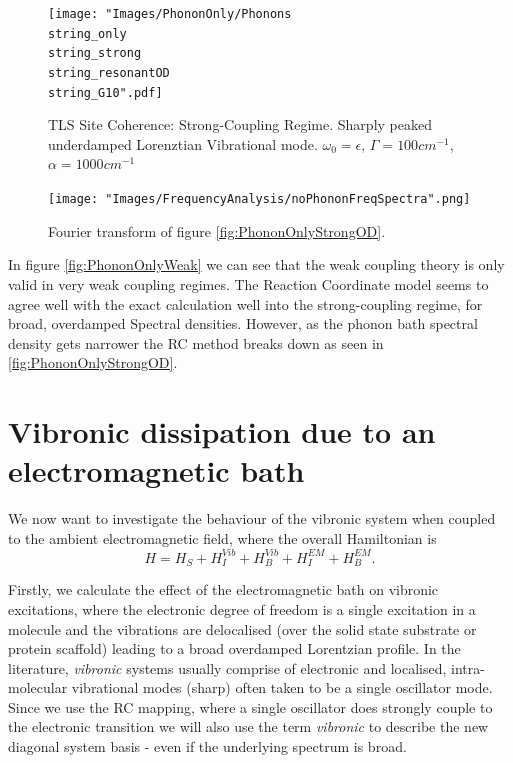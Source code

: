 \documentclass[]{article}
\begin{document}
\begin{itemize}
\begin{itemize}
\begin{figure}
	\centering
	\begin{minipage}[b]{0.45\textwidth}
		\texttt{[image: "Images/PhononOnly/Phonons\\string\_only\\string\_strong\\string\_resonantOD\\string\_G10".pdf]}
		\caption{TLS Site Coherence: Strong-Coupling Regime. Sharply peaked underdamped Lorenztian Vibrational mode. $\omega_0=\epsilon$, $\Gamma=100cm^{-1}$, $\alpha=1000cm^{-1}$}
		\label{fig:PhononOnlyStrongOD}
	\end{minipage}
	\begin{minipage}[b]{0.45\textwidth}
		\texttt{[image: "Images/FrequencyAnalysis/noPhononFreqSpectra".png]}\caption{Fourier transform of figure \ref{fig:PhononOnlyStrongOD}.}
		\label{fig:PhononOnlySpectra}
	\end{minipage}
\end{figure}
In figure \ref{fig:PhononOnlyWeak} we can see that the weak coupling theory is only valid in very weak coupling regimes. The Reaction Coordinate model seems to agree well with the exact calculation well into the strong-coupling regime, for broad, overdamped Spectral densities. However, as the phonon bath spectral density gets narrower the RC method breaks down as seen in \ref{fig:PhononOnlyStrongOD}.
\section{Vibronic dissipation due to an electromagnetic bath}
We now want to investigate the behaviour of the vibronic system when coupled to the ambient electromagnetic field, where the overall Hamiltonian is
\begin{equation}
H = H_S + H_I^{Vib} + H_B^{Vib} + H_I^{EM}+ H_B^{EM}.
\end{equation}

Firstly, we calculate the effect of the electromagnetic bath on vibronic excitations, where the electronic degree of freedom is a single excitation in a molecule and the vibrations are delocalised (over the solid state substrate or protein scaffold) leading to a broad overdamped Lorentzian profile. In the literature, \textit{vibronic} systems usually comprise of electronic and localised, intra-molecular vibrational modes (sharp) often taken to be a single oscillator mode. Since we use the RC mapping, where a single oscillator does strongly couple to the electronic transition we will also use the term \textit{vibronic} to describe the new diagonal system basis - even if the underlying spectrum is broad.


\end{itemize}
\end{itemize}
\end{document}
